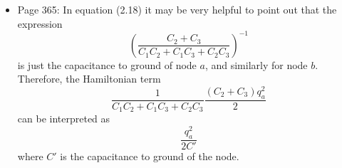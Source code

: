 \documentclass{article}
\begin{document}
\begin{itemize}
\item Page 365: In equation (2.18) it may be very helpful to point out that the expression
\begin{equation}
\left( \frac{C_2 + C_3}{C_1 C_2 + C_1 C_3 + C_2 C_3} \right)^{-1}
\end{equation}
is just the capacitance to ground of node $a$, and similarly for node $b$.
Therefore, the Hamiltonian term
\begin{equation}
\frac{1}{C_1 C_2 + C_1 C_3 + C_2 C_3} \frac{(C_2 + C_3)q_a^2}{2}
\end{equation}
can be interpreted as
\begin{equation}
\frac{q_a^2}{2 C'}
\end{equation}
where $C'$ is the capacitance to ground of the node.

\end{itemize}
\end{document}
